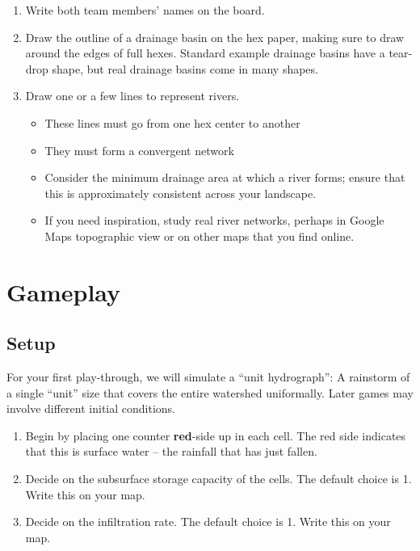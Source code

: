 \documentclass[letterpaper,10pt]{amsart}
\begin{document}
\begin{enumerate}
 \item Write both team members' names on the board.
 \item Draw the outline of a drainage basin on the hex paper, making sure to draw around the edges of full hexes. Standard example drainage basins have a tear-drop shape, but real drainage basins come in many shapes.
 \item Draw one or a few lines to represent rivers.
 \begin{itemize}
 	\item These lines must go from one hex center to another
 	\item They must form a convergent network
 	\item Consider the minimum drainage area at which a river forms; ensure that this is approximately consistent across your landscape.
 	\item If you need inspiration, study real river networks, perhaps in Google Maps topographic view or on other maps that you find online.
 \end{itemize}
\end{enumerate}

\section{Gameplay}

\subsection{Setup}

For your first play-through, we will simulate a ``unit hydrograph'': A rainstorm of a single ``unit'' size that covers the entire watershed uniformally. Later games may involve different initial conditions.

\begin{enumerate}
 \item Begin by placing one counter \textbf{red}-side up in each cell. The red side indicates that this is surface water -- the rainfall that has just fallen.
 \item Decide on the subsurface storage capacity of the cells. The default choice is 1. Write this on your map.
 \item Decide on the infiltration rate. The default choice is 1. Write this on your map.
\end{enumerate}
\end{document}
